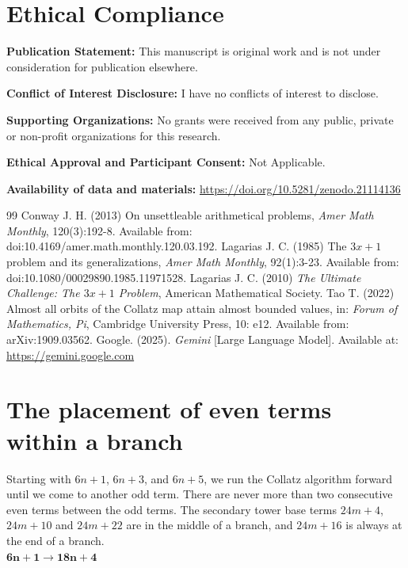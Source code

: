 \documentclass[sn-mathphys-num, pdflatex]{sn-jnl}
\begin{document}
\section*{Ethical Compliance}
\noindent \textbf{Publication Statement:} This manuscript is original work and is not under consideration for publication elsewhere. 

\noindent \textbf{Conflict of Interest Disclosure:} I have no conflicts of interest to disclose.   

\noindent \textbf{Supporting Organizations:} No grants were received from any public, private or non-profit organizations for this research. 

\noindent \textbf{Ethical Approval and Participant Consent:} Not Applicable. 

\noindent \textbf{Availability of data and materials:} \url{https://doi.org/10.5281/zenodo.21114136}

\begin{thebibliography}{99}
     Conway J. H. (2013) On unsettleable arithmetical problems, \emph{Amer Math Monthly}, 120(3):192-8. Available from: doi:10.4169/amer.math.monthly.120.03.192.
     Lagarias J. C. (1985) The $3x + 1$ problem and its generalizations, \emph{Amer Math Monthly}, 92(1):3-23. Available from: doi:10.1080/00029890.1985.11971528.
     Lagarias J. C. (2010) \emph{The Ultimate Challenge: The $3x + 1$ Problem}, American Mathematical Society.
     Tao T. (2022) Almost all orbits of the Collatz map attain almost bounded values, in: \emph{Forum of Mathematics, Pi}, Cambridge University Press, 10: e12. Available from: arXiv:1909.03562.
     Google. (2025). \textit{Gemini} [Large Language Model]. Available at: \url{https://gemini.google.com}
\end{thebibliography}

\appendix
\section{The placement of even terms within a branch}\label{app1}
Starting with $6n+1$, $6n+3$, and $6n+5$, we run the Collatz algorithm forward until we come to another odd term. There are never more than two consecutive even terms between the odd terms. The secondary tower base terms $24m+4$, $24m+10$ and $24m+22$ are in the middle of a branch, and $24m+16$ is always at the end of a branch. \\

$\boldsymbol{6n+1} \to \boldsymbol{18n+4}$ 
\end{document}
